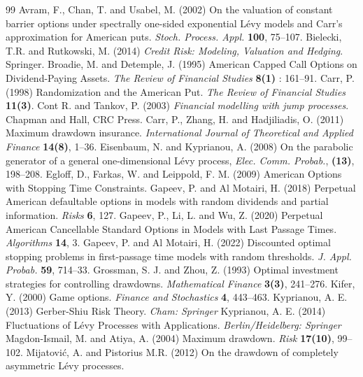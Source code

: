 \documentclass[10pt,a4paper]{amsart}
\begin{document}
\begin{thebibliography}{99}
 Avram, F., Chan, T.  and Usabel, M. (2002)
			On the valuation of constant barrier options under
			spectrally one-sided exponential L\'evy models and
			Carr’s approximation for American puts.
			{\it Stoch. Process. Appl.} {\bf 100}, 75–107.
 Bielecki, T.R. and Rutkowski, M. (2014)
			{\it Credit Risk: Modeling, Valuation and Hedging}.
			Springer.
 Broadie, M. and Detemple, J. (1995) American Capped Call Options on Dividend-Paying Assets. {\it The Review of Financial Studies} {\bf 8(1)} : 161--91.
 Carr, P. (1998) Randomization and the American Put. {\it The Review of Financial Studies} {\bf 11(3)}.
 Cont R. and Tankov, P. (2003)
			{\it Financial modelling with jump processes}.
			Chapman and Hall, CRC Press.
 Carr, P., Zhang, H. and Hadjiliadis, O. (2011) Maximum drawdown insurance. {\it International
				Journal of Theoretical and Applied Finance} {\bf 14(8)}, 1--36.
 Eisenbaum, N. and Kyprianou, A. (2008)
			On the parabolic generator of a general one-dimensional L\'evy
			process, {\it Elec. Comm. Probab.}, {\bf (13)}, 198--208.
 Egloff, D., Farkas, W. and Leippold, F. M. (2009) American Options with Stopping Time Constraints.
 Gapeev, P. and Al Motairi, H. (2018) Perpetual American defaultable options in models with random dividends and partial information. {\it Risks} {\bf 6}, 127.
 Gapeev, P., Li, L. and Wu, Z. (2020) Perpetual American Cancellable Standard Options in Models with Last Passage Times. {\it Algorithms} {\bf 14}, 3.
 Gapeev, P. and Al Motairi, H. (2022) Discounted optimal stopping problems in first-passage time models with random thresholds. {\it J. Appl. Probab.} {\bf 59}, 714--33.
 Grossman, S. J. and Zhou, Z. (1993) Optimal investment strategies for controlling drawdowns.
			{\it Mathematical Finance} {\bf 3(3)}, 241--276.
 Kifer, Y. (2000) Game options. {\it Finance and Stochastics} {\bf 4}, 443--463.
 Kyprianou, A. E. (2013) Gerber-Shiu Risk Theory. {\it Cham: Springer}
 Kyprianou, A. E. (2014) Fluctuations of Lévy Processes with Applications. {\it Berlin/Heidelberg: Springer}
 Magdon-Ismail, M. and Atiya, A. (2004) Maximum drawdown. {\it Risk} {\bf 17(10)}, 99--102.
 Mijatović, A. and Pistorius M.R. (2012) On the drawdown of completely asymmetric L\'evy processes.

\end{thebibliography}
\end{document}
